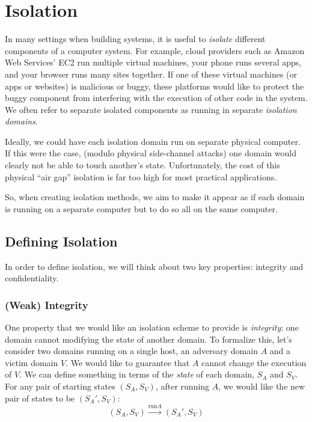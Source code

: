 \chapter{Isolation}

In many settings when building systems, it is
useful to \emph{isolate} different components of
a computer system.
For example, cloud providers such as Amazon Web Services' EC2 run multiple virtual machines,
your phone runs several apps, and your browser runs many sites together. 
If one of these virtual machines (or apps or websites) 
is malicious or buggy, these platforms would like to protect the buggy
component from interfering with the execution of other code in the system. 
We often refer to separate isolated components as running in
separate \emph{isolation domains}.

Ideally, we could have each isolation domain run on 
separate physical computer.
If this were the case, (modulo physical side-channel attacks)
one domain would clearly not be able to touch another's state.
Unfortunately, the cost of this physical ``air gap'' isolation is 
far too high for most practical applications.



So, when creating isolation methods, we aim to make it appear as if each domain is running on a separate computer but to do so all on the same computer.

\section{Defining Isolation}
In order to define isolation, we will think about two key properties: integrity and confidentiality.

\subsection{(Weak) Integrity}
One property that we would like an isolation scheme
to provide is \emph{integrity}:
one domain cannot modifying the state of another
domain. To formalize this, let's consider two
domains running on a single host, an adversary
domain $A$ and a victim domain $V$. We would like
to guarantee that $A$ cannot change the execution
of $V$. We can define something in terms of the
\emph{state} of each domain, $S_A$ and $S_V$. For
any pair of starting states $(S_A, S_V)$, after
running $A$, we would like the new pair of states
to be $(S_A', S_V)$:
\[ (S_A, S_V) \xrightarrow{\text{run} A} (S_A', S_V) \]

